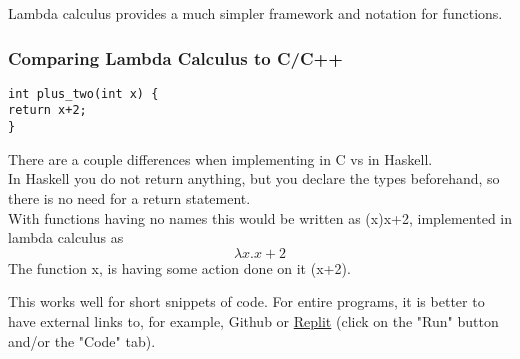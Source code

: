 \documentclass{article}
\begin{document}
Lambda calculus provides a much simpler framework and notation for functions.


\subsubsection{Comparing Lambda Calculus to C/C++}

\begin{lstlisting}
int plus_two(int x) {
return x+2;
}
\end{lstlisting}

There are a couple differences when implementing in C vs in Haskell.
\\In Haskell you do not return anything, but you declare the types beforehand, so there is no need for a return statement.
\\With functions having no names this would be written as (x){x+2}, implemented in lambda calculus as
        \[
\lambda x.x+2
\]
The function x, is having some action done on it (x+2).


\medskip\noindent
This works well for short snippets of code. For entire programs, it is better to have external links to, for example, Github or \href{https://replit.com/@alexhkurz/automata01#main.hs}{Replit} (click on the "Run" button and/or the "Code" tab).
\end{document}
